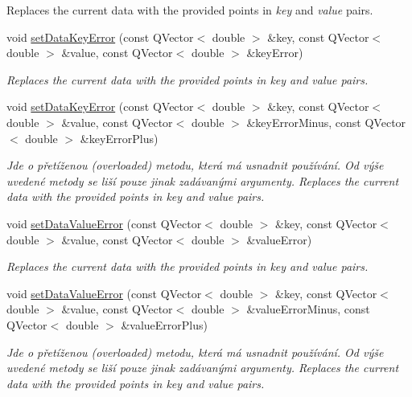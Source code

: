\begin{DoxyCompactItemize}
\begin{DoxyCompactList}
Replaces the current data with the provided points in {\itshape key} and {\itshape value} pairs. \end{DoxyCompactList}\item 
void \hyperlink{classQCPGraph_abce9f07c0d722bc3e4fa7bd73c7e5dfa}{set\+Data\+Key\+Error} (const Q\+Vector$<$ double $>$ \&key, const Q\+Vector$<$ double $>$ \&value, const Q\+Vector$<$ double $>$ \&key\+Error)
\begin{DoxyCompactList}\small\item\em Replaces the current data with the provided points in {\itshape key} and {\itshape value} pairs. \end{DoxyCompactList}\item 
void \hyperlink{classQCPGraph_ac15c749c5fedf740d5692c6fe67143b8}{set\+Data\+Key\+Error} (const Q\+Vector$<$ double $>$ \&key, const Q\+Vector$<$ double $>$ \&value, const Q\+Vector$<$ double $>$ \&key\+Error\+Minus, const Q\+Vector$<$ double $>$ \&key\+Error\+Plus)
\begin{DoxyCompactList}\small\item\em Jde o přetíženou (overloaded) metodu, která má usnadnit používání. Od výše uvedené metody se liší pouze jinak zadávanými argumenty. Replaces the current data with the provided points in {\itshape key} and {\itshape value} pairs. \end{DoxyCompactList}\item 
void \hyperlink{classQCPGraph_acba6296eadcb36b93267628b8dae3de5}{set\+Data\+Value\+Error} (const Q\+Vector$<$ double $>$ \&key, const Q\+Vector$<$ double $>$ \&value, const Q\+Vector$<$ double $>$ \&value\+Error)
\begin{DoxyCompactList}\small\item\em Replaces the current data with the provided points in {\itshape key} and {\itshape value} pairs. \end{DoxyCompactList}\item 
void \hyperlink{classQCPGraph_a3afbfd7222d739351c69387904776f93}{set\+Data\+Value\+Error} (const Q\+Vector$<$ double $>$ \&key, const Q\+Vector$<$ double $>$ \&value, const Q\+Vector$<$ double $>$ \&value\+Error\+Minus, const Q\+Vector$<$ double $>$ \&value\+Error\+Plus)
\begin{DoxyCompactList}\small\item\em Jde o přetíženou (overloaded) metodu, která má usnadnit používání. Od výše uvedené metody se liší pouze jinak zadávanými argumenty. Replaces the current data with the provided points in {\itshape key} and {\itshape value} pairs. \end{DoxyCompactList}\item 

\end{DoxyCompactItemize}
